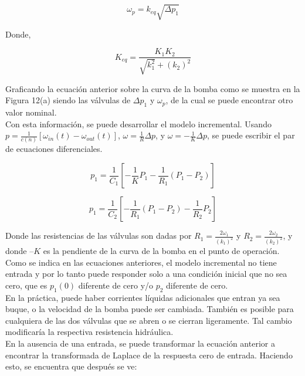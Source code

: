 \documentclass[a4paper,12pt,twoside]{proyectotanquesecci}
\begin{document}
\begin{equation}
\omega _{p}=k_{eq}\sqrt {\Delta p_{1}}
\end{equation}

Donde,

\begin{equation}
K_{eq}=\frac {K_{1}K_{2}}{\sqrt {k^{2}_{1}}+\left( k_{2}\right) ^{2}}
\end{equation}

Graficando la ecuación anterior sobre la curva de la bomba como se muestra en la Figura 12(a) siendo las válvulas de $\Delta p_{1}$ y $\omega_{p}$, de la cual se puede encontrar otro valor nominal. \\
Con esta información, se puede desarrollar el modelo incremental. Usando $p=\frac {1}{c\left( n\right) }\left[ \omega _{in}\left( t\right) -\omega _{out}\left( t\right) \right] $,  $\omega =\frac {1}{R}\Delta p$, y $\omega =-\frac {1}{K}\Delta p$, se puede escribir el par de ecuaciones diferenciales.

\begin{equation}
p_{1}=\frac {1}{C_{1}}\left[ -\frac {1}{K}P_{1}-\frac {1}{R_{1}}\left( P_{1}-P_{2}\right) \right] 
\end{equation}

\begin{equation}
p_{1}=\frac {1}{C_{2}}\left[ -\frac {1}{R_{1}}\left( P_{1}-P_{2}\right) -\frac {1}{R_{2}}P_{2}\right] 
\end{equation}

Donde las resistencias de las válvulas son dadas por $R_{1}=\frac {2\omega _{1}}{\left( k_{1}\right) ^{2}}$ y $R_{2}=\frac {2\omega _{2}}{\left( k_{2}\right) ^{2}}$, y donde $–K$ es la pendiente de la curva de la bomba en el punto de operación. Como se indica en las ecuaciones anteriores, el modelo incremental no tiene entrada y por lo tanto puede responder solo a una condición inicial que no sea cero, que es $p_{1}(0)$ diferente de cero y/o $p_{2}$ diferente de cero. \\
En la práctica, puede haber corrientes líquidas adicionales que entran ya sea buque, o la velocidad de la bomba puede ser cambiada. También es posible para cualquiera de las dos válvulas que se abren o se cierran ligeramente. Tal cambio modificaría la respectiva resistencia hidráulica. \\
En la ausencia de una entrada, se puede transformar la ecuación anterior a encontrar la transformada de Laplace de la respuesta cero de entrada. Haciendo esto, se encuentra que después se ve:
\end{document}
